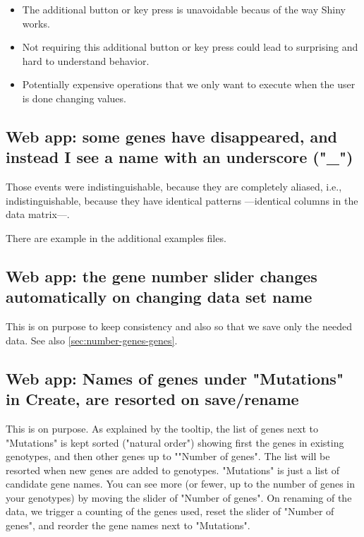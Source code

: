 \documentclass[a4paper,11pt]{article}
\begin{document}
\begin{itemize}
\item The additional button or key press is unavoidable becaus of the way Shiny works.

\item Not requiring this additional button or key press could lead to surprising and hard to understand behavior.
  
  \item Potentially expensive operations that we only want to execute when the user is done changing values.
\end{itemize}



\subsection{Web app: some genes have disappeared, and instead I see a name with an underscore ("\_")}

Those events were indistinguishable, because they are completely aliased, i.e., indistinguishable, because they have identical patterns ---identical columns in the data matrix---.

There are example in the additional examples files.

\subsection{Web app: the gene number slider changes automatically on changing data set name}\label{slider}

This is on purpose to keep consistency and also so that we save only the needed data. See also \ref{sec:number-genes-genes}.

\subsection{Web app: Names of genes under "Mutations" in Create, are resorted on save/rename}

This is on purpose. As explained by the tooltip, the list of genes next to "Mutations" is kept sorted ("natural order") showing first the genes in existing genotypes, and then other genes up to ""Number of genes". The list will be resorted when new genes are added to genotypes. "Mutations" is just a list of candidate gene names. You can see more (or fewer, up to the number of genes in your genotypes) by moving the slider of "Number of genes". On renaming of the data, we trigger a counting of the genes used, reset the slider of "Number of genes", and reorder the gene names next to "Mutations".
\end{document}
